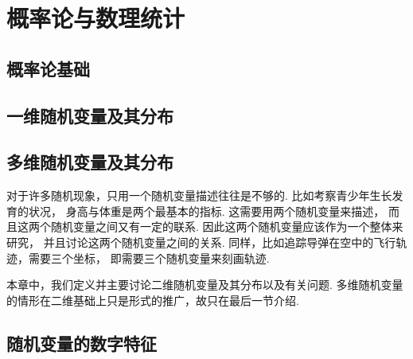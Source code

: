 \part{概率论与数理统计}
\chapter{概率论基础}






\chapter{一维随机变量及其分布}





\chapter{多维随机变量及其分布}
对于许多随机现象，只用一个随机变量描述往往是不够的.
比如考察青少年生长发育的状况，
身高与体重是两个最基本的指标.
这需要用两个随机变量来描述，
而且这两个随机变量之间又有一定的联系.
因此这两个随机变量应该作为一个整体来研究，
并且讨论这两个随机变量之间的关系.
同样，比如追踪导弹在空中的飞行轨迹，需要三个坐标，
即需要三个随机变量来刻画轨迹.

本章中，我们定义并主要讨论二维随机变量及其分布以及有关问题.
多维随机变量的情形在二维基础上只是形式的推广，故只在最后一节介绍.










\chapter{随机变量的数字特征}











